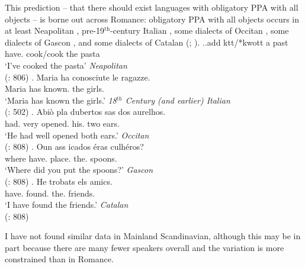 \documentclass[11pt, letterpaper]{paper_nick}
\begin{document}
This prediction -- that there should exist languages with obligatory PPA with all objects -- is borne out across Romance: obligatory PPA with all objects occurs in at least Neapolitan \Next[a], pre-19$^\text{th}$-century Italian \Next[b], some dialects of Occitan \Next[c], some dialects of Gascon \Next[d], and some dialects of Catalan \Next[e] (\citealt{belletti06}; \citealt{lopocaro16}).
\ex.\ag.{add\textyogh\textschwa} {k\textopeno tt\textschwa}/*{kwott\textschwa} a {past\textschwa}\\
have. cook/cook the pasta\\
`I've cooked the pasta' \hfill \emph{Neapolitan}\\
(\citealt{lopocaro16}: 806)
\bg. Maria ha conosciute le ragazze.\\
Maria has known. the girls.\\
`Maria has known the girls.' \hfill \emph{18$^{th}$ Century (and earlier) Italian}\\
(\citealt{belletti06}: 502)
\bg. Abi\`o pla dubertos sas dos aurelhos.\\
had. very opened. his. two ears.\\
`He had well opened both ears.' \hfill \emph{Occitan}\\
(\citealt{lopocaro16}: 808)
\bg. Oun ass icados \'eras culh\'eros?\\
where have. place. the. spoons.\\
`Where did you put the spoons?' \hfill \emph{Gascon}\\
(\citealt{lopocaro16}: 808)
\bg. He trobats els amics.\\
have. found. the. friends.\\
`I have found the friends.' \hfill \emph{Catalan}\\
(\citealt{lopocaro16}: 808)

I have not found similar data in Mainland Scandinavian, although this may be in part because there are many fewer speakers overall and the variation is more constrained than in Romance. 

\end{document}
